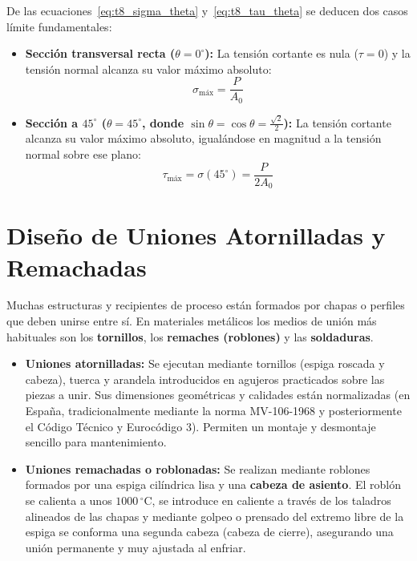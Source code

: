 De las ecuaciones~\eqref{eq:t8_sigma_theta} y~\eqref{eq:t8_tau_theta} se deducen dos casos límite fundamentales:
\begin{itemize}
    \item \textbf{Sección transversal recta ($\theta = 0^\circ$):} La tensión cortante es nula ($\tau = 0$) y la tensión normal alcanza su valor máximo absoluto:
          \begin{equation*}
              \sigma_{\text{máx}} = \frac{P}{A_0}
          \end{equation*}
    \item \textbf{Sección a $45^\circ$ ($\theta = 45^\circ$, donde $\sin\theta = \cos\theta = \frac{\sqrt{2}}{2}$):} La tensión cortante alcanza su valor máximo absoluto, igualándose en magnitud a la tensión normal sobre ese plano:
          \begin{equation*}
              \tau_{\text{máx}} = \sigma(45^\circ) = \frac{P}{2A_0}
          \end{equation*}
\end{itemize}

\section{Diseño de Uniones Atornilladas y Remachadas}

Muchas estructuras y recipientes de proceso están formados por chapas o perfiles que deben unirse entre sí. En materiales metálicos los medios de unión más habituales son los \textbf{tornillos}, los \textbf{remaches (roblones)} y las \textbf{soldaduras}.

\begin{itemize}
    \item \textbf{Uniones atornilladas:} Se ejecutan mediante tornillos (espiga roscada y cabeza), tuerca y arandela introducidos en agujeros practicados sobre las piezas a unir. Sus dimensiones geométricas y calidades están normalizadas (en España, tradicionalmente mediante la norma MV-106-1968 y posteriormente el Código Técnico y Eurocódigo 3). Permiten un montaje y desmontaje sencillo para mantenimiento.
    \item \textbf{Uniones remachadas o roblonadas:} Se realizan mediante roblones formados por una espiga cilíndrica lisa y una \textbf{cabeza de asiento}. El roblón se calienta a unos $1000\,^\circ\text{C}$, se introduce en caliente a través de los taladros alineados de las chapas y mediante golpeo o prensado del extremo libre de la espiga se conforma una segunda cabeza (cabeza de cierre), asegurando una unión permanente y muy ajustada al enfriar.
\end{itemize}

